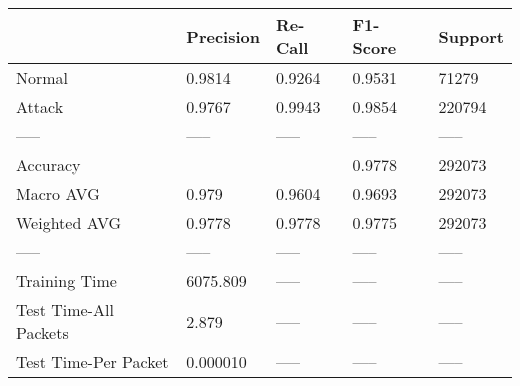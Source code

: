 \begin{tabular}{lllll}
\toprule
{} & Precision & Re-Call & F1-Score & Support \\
\midrule
Normal                &    0.9814 &  0.9264 &   0.9531 &   71279 \\
Attack                &    0.9767 &  0.9943 &   0.9854 &  220794 \\
-----                 &     ----- &   ----- &    ----- &   ----- \\
Accuracy              &           &         &   0.9778 &  292073 \\
Macro AVG             &     0.979 &  0.9604 &   0.9693 &  292073 \\
Weighted AVG          &    0.9778 &  0.9778 &   0.9775 &  292073 \\
-----                 &     ----- &   ----- &    ----- &   ----- \\
Training Time         &  6075.809 &   ----- &    ----- &   ----- \\
Test Time-All Packets &     2.879 &   ----- &    ----- &   ----- \\
Test Time-Per Packet  &  0.000010 &   ----- &    ----- &   ----- \\
\bottomrule
\end{tabular}
